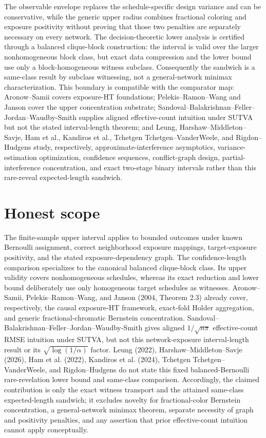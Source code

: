 \documentclass{article}
\begin{document}
The observable envelope replaces the schedule-specific design variance and can be conservative, while the generic upper radius combines fractional coloring and exposure positivity without proving that those two penalties are separately necessary on every network. The decision-theoretic lower analysis is certified through a balanced clique-block construction: the interval is valid over the larger nonhomogeneous block class, but exact data compression and the lower bound use only a block-homogeneous witness subclass. Consequently the sandwich is a same-class result by subclass witnessing, not a general-network minimax characterization. This boundary is compatible with the comparator map: Aronow--Samii covers exposure-HT foundations; Pelekis--Ramon--Wang and Janson cover the upper concentration substrate; Sandoval--Balakrishnan--Feller--Jordan--Waudby-Smith supplies aligned effective-count intuition under SUTVA but not the stated interval-length theorem; and Leung, Harshaw--Middleton--Savje, Ham et al., Kandiros et al., Tchetgen Tchetgen--VanderWeele, and Rigdon--Hudgens study, respectively, approximate-interference asymptotics, variance-estimation optimization, confidence sequences, conflict-graph design, partial-interference concentration, and exact two-stage binary intervals rather than this rare-reveal expected-length sandwich.

\section{Honest scope}

The finite-sample upper interval applies to bounded outcomes under known Bernoulli assignment, correct neighborhood exposure mappings, target-exposure positivity, and the stated exposure-dependency graph. The confidence-length comparison specializes to the canonical balanced clique-block class. Its upper validity covers nonhomogeneous schedules, whereas its exact reduction and lower bound deliberately use only homogeneous target schedules as witnesses. Aronow--Samii, Pelekis--Ramon--Wang, and Janson (2004, Theorem 2.3) already cover, respectively, the causal exposure-HT framework, exact-fold Holder aggregation, and generic fractional-chromatic Bernstein concentration. Sandoval--Balakrishnan--Feller--Jordan--Waudby-Smith gives aligned \(1/\sqrt{n\pi}\) effective-count RMSE intuition under SUTVA, but not this network-exposure interval-length result or its \(\sqrt{\log(1/\alpha)}\) factor. Leung (2022), Harshaw--Middleton--Savje (2026), Ham et al. (2022), Kandiros et al. (2024), Tchetgen Tchetgen--VanderWeele, and Rigdon--Hudgens do not state this fixed balanced-Bernoulli rare-revelation lower bound and same-class comparison. Accordingly, the claimed contribution is only the exact witness transport and the attained same-class expected-length sandwich; it excludes novelty for fractional-color Bernstein concentration, a general-network minimax theorem, separate necessity of graph and positivity penalties, and any assertion that prior effective-count intuition cannot apply conceptually.
\end{document}
